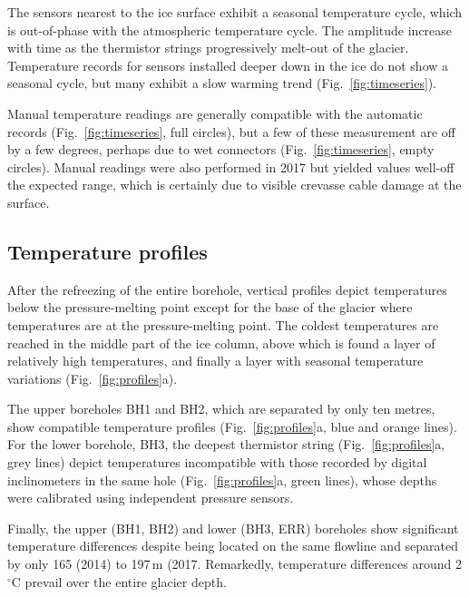 \documentclass[utf8]{article}
\begin{document}
    The sensors nearest to the ice surface exhibit a seasonal temperature
    cycle, which is out-of-phase with the atmospheric temperature cycle. The
    amplitude increase with time as the thermistor strings progressively
    melt-out of the glacier. Temperature records for sensors installed deeper
    down in the ice do not show a seasonal cycle, but many exhibit a slow
    warming trend (Fig.~\ref{fig:timeseries}).

    Manual temperature readings are generally compatible with the automatic
    records (Fig.~\ref{fig:timeseries}, full circles), but a few of these
    measurement are off by a few degrees, perhaps due to wet connectors
    (Fig.~\ref{fig:timeseries}, empty circles). Manual readings were also
    performed in 2017 but yielded values well-off the expected range, which
    is certainly due to visible crevasse cable damage at the surface.


\subsection{Temperature profiles}

    After the refreezing of the entire borehole, vertical profiles depict
    temperatures below the pressure-melting point except for the base of the
    glacier where temperatures are at the pressure-melting point. The coldest
    temperatures are reached in the middle part of the ice column, above which
    is found a layer of relatively high temperatures, and finally a layer with
    seasonal temperature variations (Fig.~\ref{fig:profiles}a).

    The upper boreholes BH1 and BH2, which are separated by only ten metres,
    show compatible temperature profiles (Fig.~\ref{fig:profiles}a, blue and
    orange lines). For the lower borehole, BH3, the deepest thermistor string
    (Fig.~\ref{fig:profiles}a, grey lines) depict temperatures incompatible
    with those recorded by digital inclinometers in the same hole
    (Fig.~\ref{fig:profiles}a, green lines), whose depths were calibrated
    using independent pressure sensors.

    Finally, the upper (BH1, BH2) and lower (BH3, ERR) boreholes show
    significant temperature differences despite being located on the same
    flowline and separated by only 165 (2014) to 197\,m (2017. Remarkedly,
    temperature differences
    around 2$^\circ$C prevail over the entire glacier depth.
\end{document}
